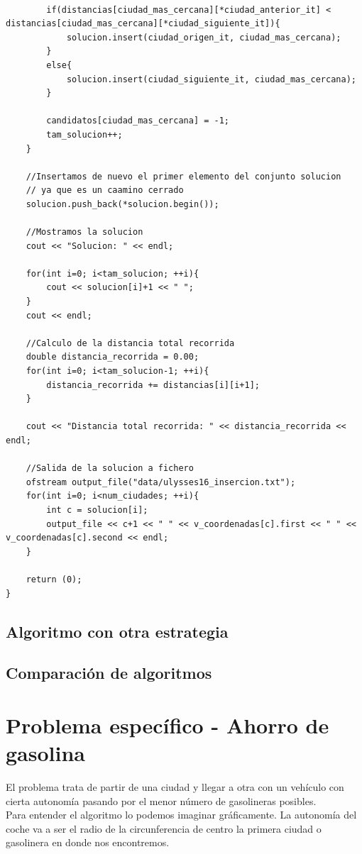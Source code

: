 \documentclass[11pt,a4paper]{article} %
\begin{document}
\begin{lstlisting}[style=C++]
		
		if(distancias[ciudad_mas_cercana][*ciudad_anterior_it] < distancias[ciudad_mas_cercana][*ciudad_siguiente_it]){
			solucion.insert(ciudad_origen_it, ciudad_mas_cercana);
		}
		else{
			solucion.insert(ciudad_siguiente_it, ciudad_mas_cercana);
		}
		
		candidatos[ciudad_mas_cercana] = -1;
		tam_solucion++;
	}
	
	//Insertamos de nuevo el primer elemento del conjunto solucion
	// ya que es un caamino cerrado
	solucion.push_back(*solucion.begin());
	
	//Mostramos la solucion
	cout << "Solucion: " << endl;
	
	for(int i=0; i<tam_solucion; ++i){
		cout << solucion[i]+1 << " ";
	}
	cout << endl;
	
	//Calculo de la distancia total recorrida
	double distancia_recorrida = 0.00;
	for(int i=0; i<tam_solucion-1; ++i){
		distancia_recorrida += distancias[i][i+1];
	}
	
	cout << "Distancia total recorrida: " << distancia_recorrida << endl;
	
	//Salida de la solucion a fichero
	ofstream output_file("data/ulysses16_insercion.txt");
	for(int i=0; i<num_ciudades; ++i){
		int c = solucion[i];
		output_file << c+1 << " " << v_coordenadas[c].first << " " << v_coordenadas[c].second << endl;
	}
	
	return (0);
}
\end{lstlisting}


\newpage
\subsection{Algoritmo con otra estrategia}


\newpage
\subsection{Comparación de algoritmos}


\newpage
\section{Problema específico - Ahorro de gasolina}
El problema trata de partir de una ciudad y llegar a otra con un vehículo con cierta autonomía pasando por el menor número de gasolineras posibles.\\

Para entender el algoritmo lo podemos imaginar gráficamente. La autonomía del coche va a ser el radio de la circunferencia de centro la primera ciudad o gasolinera en donde nos encontremos.\\
\end{document}
